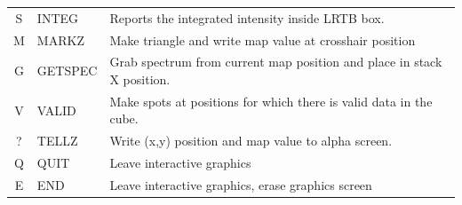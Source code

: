 \documentclass[11pt,twoside]{report}
\begin{document}
\begin{table}[htbp]
\begin{center}
\begin{tabular}{|c|l|l|}
S & INTEG & Reports the integrated intensity inside LRTB box.\\
M & MARKZ & Make triangle and write map value at crosshair position\\
G & GETSPEC & \parbox[t]{3.7in}{Grab spectrum from current map position and place in
                      stack X position.}\\
V & VALID & \parbox[t]{3.7in}{Make spots at positions for which there is valid
                    data in the cube.}\\
? & TELLZ & Write (x,y) position and map value to alpha screen.\\
Q & QUIT & Leave interactive graphics\\
E &END &Leave interactive graphics, erase graphics screen\\ \hline
\end{tabular}
\end{center}
\end{table}


\end{document}
